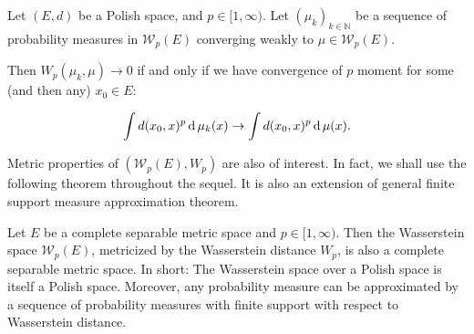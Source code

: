 \begin{thm}
	\label{thm:Wp_metricizes_weak_convergence}
	Let \( ( E , d ) \) be a Polish space, and \( p \in [ 1 , \infty ) \).
	Let \( \left( \mu _ { k } \right) _ { k \in \mathbb{ N } } \) be a
	sequence of probability measures in \( \mathcal{W}_p ( E ) \)
	converging weakly to \( \mu \in \mathcal{W}_p(E)	\).

	Then \( W_p \left( \mu _ { k }, \mu \right) \rightarrow 0 \)
	if and only if we have convergence of $p$ moment for
	some (and then any) \( x _ { 0 } \in E\):

	\[
		\int d ( x _ { 0 } , x ) ^ { p } \operatorname{d} \mu _ { k } ( x ) \rightarrow \int d ( x _ { 0 } , x ) ^ { p } \operatorname{d} \mu ( x ).
	\]

\end{thm}

Metric properties of $(\mathcal{W}_p(E), W_p)$ are also of interest.
In fact, we shall use the following theorem  throughout the sequel.
It is also an extension of general finite support measure approximation theorem.
\begin{thm}
	\label{thm:topology_Wasserstein}
	Let \( E \) be a complete separable metric space and \( p \in [ 1 , \infty ) \).
	Then the Wasserstein space \( \mathcal{W}_p(E) \),
	metricized by the Wasserstein distance \( W _ { p }\),
	is also a complete separable metric space.
	In short: The Wasserstein space over a Polish space is itself a Polish space.
	Moreover, any probability measure can be approximated by a sequence of probability measures with finite support
	with respect to Wasserstein distance.
\end{thm}
